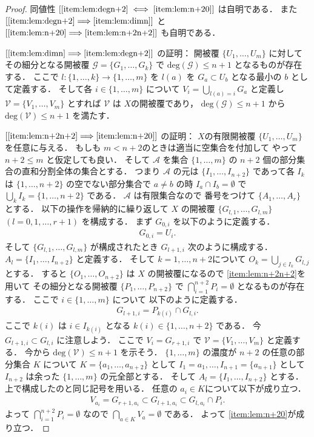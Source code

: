 \documentclass[leqno, a4paper, 12pt]{jsarticle}
\theoremstyle{plain}
\theoremstyle{definition}
\theoremstyle{remark}
\newcommand{\To}{\Longrightarrow}
\newcommand{\yodeg}{\mathrm{deg}}
\newcommand{\yocovf}[1]{\mathscr{#1}}
\numberwithin{equation}{section}
\begin{document}
\begin{proof}
同値性
$[\ref{item:lem:degn+2} \iff \ref{item:lem:n+20}]$
は自明である．
また
$[\ref{item:lem:degn+2}\To \ref{item:lem:dimn}]$
と
$[ \ref{item:lem:n+20}\To \ref{item:lem:n+2n+2}]$
も自明である．


$[\ref{item:lem:dimn}\To \ref{item:lem:degn+2}]$
の証明：
開被覆
$\{U_{1}, \dots, U_{m}\}$
に対してその細分となる開被覆
$\yocovf{G}=\{G_{1}, \dots, G_{k}\}$
で
$\yodeg(\yocovf{G})\le n+1$
となるものが存在する．
ここで
$l\colon \{1, \dots, k\}\to \{1, \dots, m\}$
を
$l(a)$
を
$G_{a}\subset U_{b}$
となる最小の
$b$
として定義する．
そして各
$i\in \{1, \dots,  m\}$
について
$V_{i}=\bigcup_{l(a)=i}G_{a}$
と定義し
$\yocovf{V}=\{V_{1}, \dots, V_{m}\}$
とすれば
$\yocovf{V}$
は
$X$の開被覆であり，
$\yodeg(\yocovf{G})\le n+1$
から
$\yodeg(\yocovf{V})\le n+1$
を満たす．

$[\ref{item:lem:n+2n+2}\To \ref{item:lem:n+20}]$
の証明：
$X$の有限開被覆
$\{U_{1}, \dots, U_{m}\}$
を任意に与える．
もしも
$m<n+2$のときは適当に空集合を付加して
やって
$n+2\le m$
と仮定しても良い．
そして
$\yocovf{A}$
を集合
$\{1, \dots, m\}$
の
$n+2$
個の部分集合の直和分割全体の集合とする．
つまり
$\yocovf{A}$
の元は
$\{I_{1}, \dots,  I_{n+2}\}$
であって各
$I_{k}$
は
$\{1, \dots, n+2\}$
の空でない部分集合で
$a\neq b$
の時
$I_{a}\cap I_{b}=\emptyset$
で
$\bigcup_{k}I_{k}=\{1, \dots, n+2\}$
である．
$\yocovf{A}$
は有限集合なので
番号をつけて
$\{A_{1}, \dots, A_{r}\}$
とする．
以下の操作を帰納的に繰り返して
$X$
の開被覆
$\{G_{l, 1}, \dots, G_{l, m}\}$
$(l=0, 1, \dots, r+1)$
を構成する．
まず
$G_{0, i}$
を以下のように定義する．
\begin{align}
G_{0, i}=U_{i}. 
\end{align}
そして
$\{G_{l, 1}, \dots, G_{l, m}\}$
が構成されたとき
$G_{l+1, i}$
次のように構成する．
$A_{l}=\{I_{1}, \dots, I_{n+2}\}$
と定義する．
そして
$k=1, \dots, n+2$について
$O_{k}=\bigcup_{j\in I_{k}}G_{l, j}$
とする．
すると
$\{O_{1}, \dots, O_{n+2}\}$
は
$X$
の開被覆になるので
\ref{item:lem:n+2n+2}を用いて
その細分となる開被覆
$\{P_{1}, \dots, P_{n+2}\}$
で
$\bigcap_{i=1}^{n+2}P_{i}=\emptyset$
となるものが存在する．
ここで
$i\in \{1, \dots, m\}$
について
以下のように定義する．
\begin{align}
G_{l+1, i}=P_{k(i)}\cap G_{l, i}. 
\end{align}
ここで
$k(i)$
は
$i\in I_{k(i)}$
となる
$k(i)\in \{1, \dots, n+2\}$
である．
今
$G_{l+1, i}\subset G_{l, i}$
に注意しよう．
ここで
$V_{i}=G_{r+1, i}$
で
$\yocovf{V}=\{V_{1}, \dots, V_{m}\}$
と定義する．
今から
$\yodeg(\yocovf{V})\le n+1$
を示そう．
$\{1, \dots, m\}$
の濃度が
$n+2$
の任意の部分集合
$K$
について
$K=\{a_{1}, \dots, a_{n+2}\}$
として
$I_{1}=a_{1}, \dots, I_{n+1}=\{a_{n+1}\}$
として
$I_{n+2}$
は余った
$\{1, \dots, m\}$
の元全部とする．
そして
$A_{l}=\{I_{1}, \dots, I_{n+2}\}$
とする．
上で構成したのと同じ記号を用いる．
任意の
$a_{i}\in K$について以下が成り立つ．
\begin{align}
V_{a_{i}}=G_{r+1, a_{i}}\subset G_{l+1, a_{i}}\subset G_{l, a_{i}}\cap P_{i}. 
\end{align}
よって
$\bigcap_{i=1}^{n+2}P_{i}=\emptyset$
なので
$\bigcap_{a\in K}V_{a}=\emptyset$
である．
よって
\ref{item:lem:n+20}が成り立つ．


\end{proof}
\end{document}
